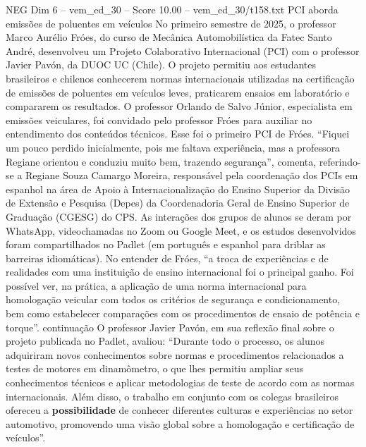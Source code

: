 \begin{textsample}{NEG Dim 6 – vem\_ed\_30 – Score 10.00 – vem\_ed\_30/t158.txt}  \label{ex:f6_neg_071}
PCI aborda emissões de poluentes em veículos No primeiro semestre de 2025, o professor Marco Aurélio Fróes, do curso de Mecânica Automobilística da Fatec Santo André, desenvolveu um Projeto Colaborativo Internacional (PCI) com o professor Javier Pavón, da DUOC UC (Chile).
O projeto permitiu aos estudantes brasileiros e chilenos conhecerem normas internacionais utilizadas na certificação de emissões de poluentes em veículos leves, praticarem ensaios em laboratório e compararem os resultados.
O professor Orlando de Salvo Júnior, especialista em emissões veiculares, foi convidado pelo professor Fróes para auxiliar no entendimento dos conteúdos técnicos.
Esse foi o primeiro PCI de Fróes. “Fiquei um pouco perdido inicialmente, pois me faltava experiência, mas a professora Regiane orientou e conduziu muito bem, trazendo segurança”, comenta, referindo-se a Regiane Souza Camargo Moreira, responsável pela coordenação dos PCIs em espanhol na área de Apoio à Internacionalização do Ensino Superior da Divisão de Extensão e Pesquisa (Depes) da Coordenadoria Geral de Ensino Superior de Graduação (CGESG) do CPS.
As interações dos grupos de alunos se deram por WhatsApp, videochamadas no Zoom ou Google Meet, e os estudos desenvolvidos foram compartilhados no Padlet (em português e espanhol para driblar as barreiras idiomáticas).
No entender de Fróes, “a troca de experiências e de realidades com uma instituição de ensino internacional foi o principal ganho.
Foi possível ver, na prática, a aplicação de uma norma internacional para homologação veicular com todos os critérios de segurança e condicionamento, bem como estabelecer comparações com os procedimentos de ensaio de potência e torque”. continuação O professor Javier Pavón, em sua reflexão final sobre o projeto publicada no Padlet, avaliou: “Durante todo o processo, os alunos adquiriram novos conhecimentos sobre normas e procedimentos relacionados a testes de motores em dinamômetro, o que lhes permitiu ampliar seus conhecimentos técnicos e aplicar metodologias de teste de acordo com as normas internacionais.
Além disso, o trabalho em conjunto com os colegas brasileiros ofereceu a \textbf{possibilidade} de conhecer diferentes culturas e experiências no setor automotivo, promovendo uma visão global sobre a homologação e certificação de veículos”.

\end{textsample}
